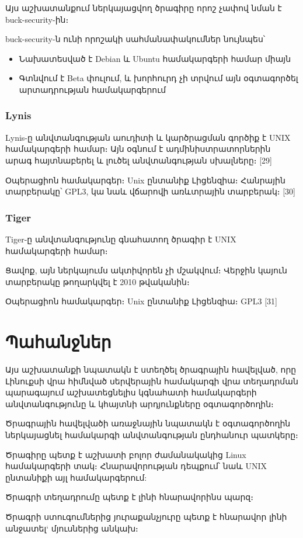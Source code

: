 \documentclass[a4paper,12pt]{article}
\begin{document}
\begin{sloppypar}
Այս աշխատանքում ներկայացվող ծրագիրը որոշ չափով նման է buck-security-ին։

buck-security-ն ունի որոշակի սահմանափակումներ նույնպես՝
\begin{itemize}
\item Նախատեսված է Debian և Ubuntu համակարգերի համար միայն
\item Գտնվում է Beta փուլում, և խորհուրդ չի տրվում այն օգտագործել
	արտադրության համակարգերում
\end{itemize}


\subsubsection{Lynis}


Lynis-ը անվտանգության աուդիտի և կարծրացման գործիք է UNIX համակարգերի համար։
Այն օգնում է ադմինիստրատորներին արագ հայտնաբերել և լուծել
անվտանգության սխալները։
[29]

Օպերացիոն համակարգեր։ Unix ընտանիք
Լիցենզիա։ Հանրային տարբերակը՝ GPL3, կա նաև վճարովի առևտրային տարբերակ։
[30]


\subsubsection{Tiger}


Tiger-ը անվտանգությունը գնահատող ծրագիր է UNIX համակարգերի համար։

Ցավոք, այն ներկայումս ակտիվորեն չի մշակվում։ Վերջին կայուն տարբերակը
թողարկվել է 2010 թվականին։

Օպերացիոն համակարգեր։ Unix ընտանիք
Լիցենզիա։ GPL3
[31]


\section{Պահանջներ}


Այս աշխատանքի նպատակն է ստեղծել ծրագրային հավելված, որը Լինուքսի
վրա հիմնված սերվերային համակարգի վրա տեղադրման պարագայում
աշխատեցնելիս կգնահատի համակարգերի անվտանգությունը և կհայտնի
արդյունքները օգտագործողին։

Ծրագրային հավելվածի առաջնային նպատակն է օգտագործողին ներկայացնել
համակարգի անվտանգության ընդհանուր պատկերը։

Ծրագիրը պետք է աշխատի բոլոր ժամանակակից Linux համակարգերի տակ։
Հնարավորության դեպքում՝ նաև UNIX ընտանիքի այլ համակարգերում:

Ծրագրի տեղադրումը պետք է լինի հնարավորինս պարզ։

Ծրագրի ստուգումներից յուրաքանչյուրը պետք է հնարավոր լինի անջատել`
մյուսներից անկախ։


\end{sloppypar}
\end{document}
